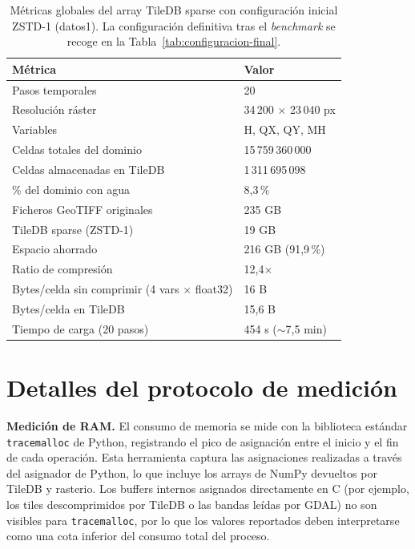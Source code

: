 \begin{table}[ht]
\centering
\begin{tabularx}{\textwidth}{>{\raggedright\arraybackslash}p{9.5cm}L}
\toprule
\textbf{Métrica} & \textbf{Valor} \\
\midrule
Pasos temporales & 20 \\
Resolución ráster & 34\,200 $\times$ 23\,040 px \\
Variables & H, QX, QY, MH \\
Celdas totales del dominio & 15\,759\,360\,000 \\
Celdas almacenadas en TileDB & 1\,311\,695\,098 \\
\% del dominio con agua & 8,3\,\% \\
\addlinespace[6pt]
Ficheros GeoTIFF originales & 235 GB \\
TileDB sparse (ZSTD-1) & 19 GB \\
Espacio ahorrado & 216 GB (91,9\,\%) \\
Ratio de compresión & 12,4$\times$ \\
\addlinespace[6pt]
Bytes/celda sin comprimir (4 vars $\times$ float32) & 16 B \\
Bytes/celda en TileDB & 15,6 B \\
Tiempo de carga (20 pasos) & 454 s ($\sim$7,5 min) \\
\bottomrule
\end{tabularx}
\caption{Métricas globales del array TileDB sparse con configuración inicial ZSTD-1 (datos1). La configuración definitiva tras el \textit{benchmark} se recoge en la Tabla~\ref{tab:configuracion-final}.}
\label{tab:metricas-tdb}
\end{table}

\section{Detalles del protocolo de medición}\label{b-protocolo-detalles}

\textbf{Medición de RAM.} El consumo de memoria se mide con la biblioteca estándar \texttt{tracemalloc} de Python, registrando el pico de asignación entre el inicio y el fin de cada operación. Esta herramienta captura las asignaciones realizadas a través del asignador de Python, lo que incluye los arrays de NumPy devueltos por TileDB y rasterio. Los buffers internos asignados directamente en C (por ejemplo, los tiles descomprimidos por TileDB o las bandas leídas por GDAL) no son visibles para \texttt{tracemalloc}, por lo que los valores reportados deben interpretarse como una cota inferior del consumo total del proceso.

